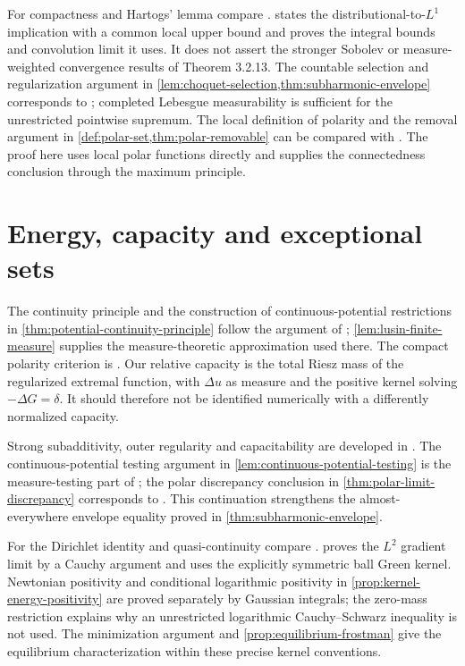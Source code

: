 For compactness and Hartogs' lemma compare \cite[Theorems 3.2.12--3.2.13, pp.~149--151]{Hor07}.  states the distributional-to-$L^1$ implication with a common local upper bound and proves the integral bounds and convolution limit it uses. It does not assert the stronger Sobolev or measure-weighted convergence results of Theorem 3.2.13. The countable selection and regularization argument in \cref{lem:choquet-selection,thm:subharmonic-envelope} corresponds to \cite[Proposition 3.4.4, pp.~205--206]{Hor07}; completed Lebesgue measurability is sufficient for the unrestricted pointwise supremum. The local definition of polarity and the removal argument in \cref{def:polar-set,thm:polar-removable} can be compared with \cite[Definition 3.4.1 and Theorem 3.4.3, pp.~203--205]{Hor07}. The proof here uses local polar functions directly and supplies the connectedness conclusion through the maximum principle.

\section{Energy, capacity and exceptional sets}
\label{sec:history-capacity}
The continuity principle and the construction of continuous-potential restrictions in \cref{thm:potential-continuity-principle} follow the argument of \cite[Theorems 3.4.6--3.4.7, pp.~207--208]{Hor07}; \cref{lem:lusin-finite-measure} supplies the measure-theoretic approximation used there. The compact polarity criterion is \cite[Theorem 3.4.5, pp.~206--208]{Hor07}. Our relative capacity is the total Riesz mass of the regularized extremal function, with $\Delta u$ as measure and the positive kernel solving $-\Delta G=\delta$. It should therefore not be identified numerically with a differently normalized capacity.

Strong subadditivity, outer regularity and capacitability are developed in \cite[Section 3.4, pp.~209--216, especially Theorems 3.4.9 and 3.4.12 and Proposition 3.4.13]{Hor07}. The continuous-potential testing argument in \cref{lem:continuous-potential-testing} is the measure-testing part of \cite[Theorem 3.2.13, pp.~150--151]{Hor07}; the polar discrepancy conclusion in \cref{thm:polar-limit-discrepancy} corresponds to \cite[Theorem 3.4.14, pp.~216--217]{Hor07}. This continuation strengthens the almost-everywhere envelope equality proved in \cref{thm:subharmonic-envelope}.

For the Dirichlet identity and quasi-continuity compare \cite[Propositions 3.4.19 and 3.4.21, pp.~221--223]{Hor07}.  proves the $L^2$ gradient limit by a Cauchy argument and uses the explicitly symmetric ball Green kernel. Newtonian positivity and conditional logarithmic positivity in \cref{prop:kernel-energy-positivity} are proved separately by Gaussian integrals; the zero-mass restriction explains why an unrestricted logarithmic Cauchy--Schwarz inequality is not used. The minimization argument and \cref{prop:equilibrium-frostman} give the equilibrium characterization within these precise kernel conventions.


